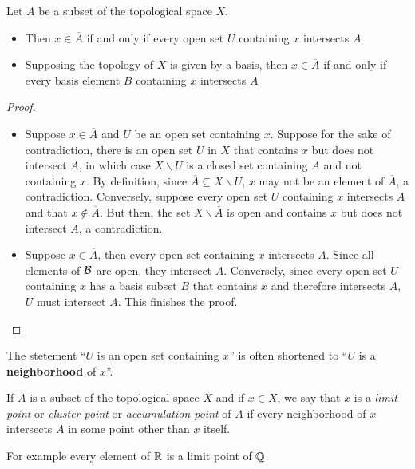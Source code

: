 \begin{theorem}
    Let $A$ be a subset of the topological space $X$.
    \begin{itemize}
        \item Then $x\in\overline{A}$ if and only if every open set $U$ containing $x$ intersects $A$ 
        \item Supposing the topology of $X$ is given by a basis, then $x\in\overline{A}$ if and only if every basis element $B$ containing $x$ intersects $A$
    \end{itemize}
\end{theorem}
\begin{proof}
    \hfill 
    \begin{itemize}
        \item Suppose $x\in\overline{A}$ and $U$ be an open set containing $x$. Suppose for the sake of contradiction, there is an open set $U$ in $X$ that contains $x$ but does not intersect $A$, in which case $X\backslash U$ is a closed set containing $A$ and not containing $x$. By definition, since $\overline{A}\subseteq X\backslash U$, $x$ may not be an element of $\overline{A}$, a contradiction. Conversely, suppose every open set $U$ containing $x$ intersects $A$ and that $x\notin\overline{A}$. But then, the set $X\backslash\overline{A}$ is open and contains $x$ but does not intersect $A$, a contradiction.
        \item Suppose $x\in\overline{A}$, then every open set containing $x$ intersects $A$. Since all elements of $\mathcal{B}$ are open, they intersect $A$. Conversely, since every open set $U$ containing $x$ has a basis subset $B$ that contains $x$ and therefore intersects $A$, $U$ must intersect $A$. This finishes the proof.
    \end{itemize}
\end{proof}

The stetement ``$U$ is an open set containing $x$'' is often shortened to ``$U$ is a \textbf{neighborhood} of $x$''.

\begin{definition}
    If $A$ is a subset of the topological space $X$ and if $x\in X$, we say that $x$ is a \textit{limit point} or \textit{cluster point} or \textit{accumulation point} of $A$ if every neighborhood of $x$ intersects $A$ in some point other than $x$ itself.
\end{definition}
For example every element of $\mathbb{R}$ is a limit point of $\mathbb{Q}$.

